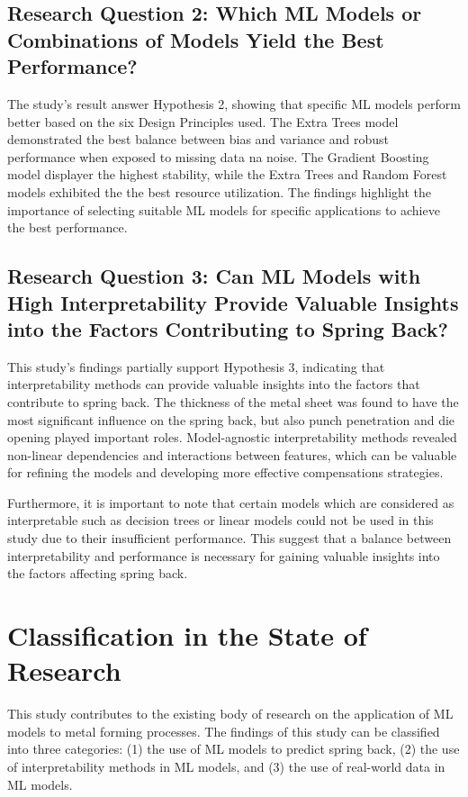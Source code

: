 \subsection{Research Question 2: Which ML Models or Combinations of Models Yield the Best Performance?}
\label{subsec:research-question-2:-which-ml-models-or-combinations-of-models-yield-the-best-performance?}
The study's result answer Hypothesis 2, showing that specific \ac{ML} models perform better based on the six Design
Principles used.
The Extra Trees model demonstrated the best balance between bias and variance and robust performance when exposed to
missing data na noise.
The Gradient Boosting model displayer the highest stability, while the Extra Trees and Random Forest models exhibited
the the best resource utilization.
The findings highlight the importance of selecting suitable \ac{ML} models for specific applications to achieve the
best performance.

\subsection{Research Question 3: Can ML Models with High Interpretability Provide Valuable Insights into the Factors
Contributing to Spring Back?}
\label{subsec:research-question-3:-can-ml-models-with-high-interpretability-provide
-valuable-insights-into-the-factors-
contributing-to-spring-back?}
This study's findings partially support Hypothesis 3, indicating that interpretability methods can provide valuable
insights into the factors that contribute to spring back.
The thickness of the metal sheet was found to have the most significant influence on the spring back, but also punch
penetration and die opening played important roles.
Model-agnostic interpretability methods revealed non-linear dependencies and interactions between features, which can
be valuable for refining the models and developing more effective compensations strategies.

Furthermore, it is important to note that certain models which are considered as interpretable such as decision trees
or linear models could not be used in this study due to their insufficient performance.
This suggest that a balance between interpretability and performance is necessary for gaining valuable insights into
the factors affecting spring back.

\section{Classification in the State of Research}\label{sec:classification-in-the-state-of-research}
This study contributes to the existing body of research on the application of ML models to metal forming processes.
The findings of this study can be classified into three categories: (1) the use of ML models to predict spring back,
(2) the use of interpretability methods in ML models, and (3) the use of real-world data in ML models.

